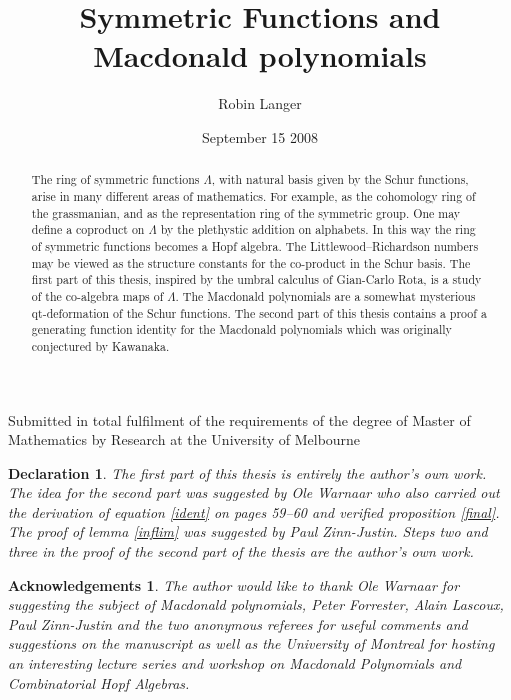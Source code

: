 \documentclass[12pt,dvips]{amsart}
\newtheorem*{declaration}{Declaration}%
\newtheorem*{acknowledgements}{Acknowledgements}
\begin{document}
\title{Symmetric Functions and Macdonald polynomials}
\author{Robin Langer}	
\date{September 15 2008}
\maketitle
\begin{center}
Submitted in total fulfilment of the requirements of the degree of Master of Mathematics by Research at the University of Melbourne
\end{center}



\newpage
\begin{abstract}
The ring of symmetric functions $\Lambda$, with natural basis given by the Schur functions, arise in many different areas of mathematics. For example, as the cohomology ring of the grassmanian, and as the representation ring of the symmetric group. One may define a coproduct on $\Lambda$ by the plethystic addition on alphabets. In this way the ring of symmetric functions becomes a Hopf algebra. The Littlewood--Richardson numbers may be viewed as the structure constants for the co-product in the Schur basis. The first part of this thesis, inspired by the umbral calculus of Gian-Carlo Rota, is a study of the co-algebra maps of $\Lambda$. The Macdonald polynomials are a somewhat mysterious qt-deformation of the Schur functions. The second part of this thesis contains a proof a generating function identity for the Macdonald polynomials which was originally conjectured by Kawanaka.
\end{abstract}

\newpage

\begin{declaration}
The first part of this thesis is entirely the author's own work. The idea for the second part was suggested by Ole Warnaar who also carried out the derivation of equation \ref{ident} on pages 59--60 and verified proposition \ref{final}. The proof of lemma \ref{inflim} was suggested by Paul Zinn-Justin. Steps two and three in the proof of the second part of the thesis are the author's own work.
\end{declaration}

\newpage

\begin{acknowledgements}
The author would like to thank Ole Warnaar for suggesting the subject of Macdonald polynomials, Peter Forrester, Alain Lascoux, Paul Zinn-Justin and the two anonymous referees for useful comments and suggestions on the manuscript as well as the University of Montreal for hosting an interesting lecture series and workshop on Macdonald Polynomials and Combinatorial Hopf Algebras.
\end{acknowledgements}
\end{document}
